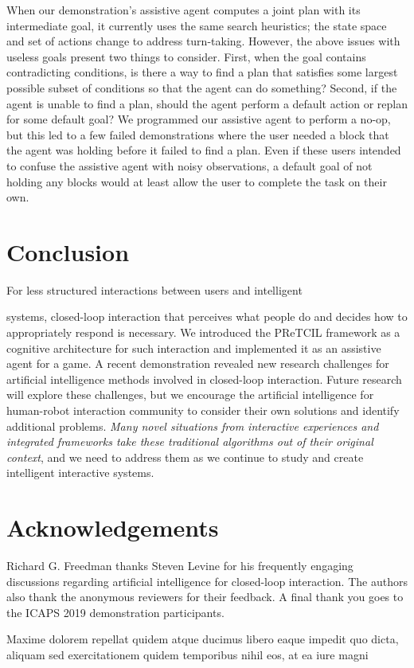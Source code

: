 \documentclass[letterpaper]{article} %
\begin{document}
When our demonstration's assistive agent computes a joint plan with its intermediate goal, it currently uses the same search heuristics; the state space and set of actions change to address turn-taking.  However, the above issues with useless goals present two things to consider.  First, when the goal contains contradicting conditions, is there a way to find a plan that satisfies some largest possible subset of conditions so that the agent can do something?  Second, if the agent is unable to find a plan, should the agent perform a default action or replan for some default goal?  We programmed our assistive agent to perform a no-op, but this led to a few failed demonstrations where the user needed a block that the agent was holding before it failed to find a plan.  Even if these users intended to confuse the assistive agent with noisy observations, a default goal of %
not holding any blocks would at least allow the user to complete the task on their own. %





\section{Conclusion\label{sec:conclusion}}
For less structured interactions between users and intelligent

\noindent systems, closed-loop interaction that perceives what people do and decides how to appropriately respond is necessary.  We introduced the {\sc PReTCIL} framework as a cognitive architecture for such interaction and implemented it as an assistive agent for a game.  A recent demonstration %
revealed new research challenges for artificial intelligence methods involved in closed-loop interaction. %
Future research will explore these challenges, but we encourage the artificial intelligence for human-robot interaction community to consider their own solutions and identify additional problems.  \textit{Many novel situations from interactive experiences and integrated frameworks take these traditional algorithms out of their original context}, and we need to address them as we continue to study and create intelligent interactive systems.

\section*{Acknowledgements} Richard G. Freedman thanks Steven Levine for his frequently engaging discussions regarding artificial intelligence for closed-loop interaction.  The authors also thank the anonymous reviewers for their feedback.  A final thank you goes to the ICAPS 2019 demonstration participants.  %

Maxime dolorem repellat quidem atque ducimus libero eaque impedit quo dicta, aliquam sed exercitationem quidem temporibus nihil eos, at ea iure magni


\end{document}
